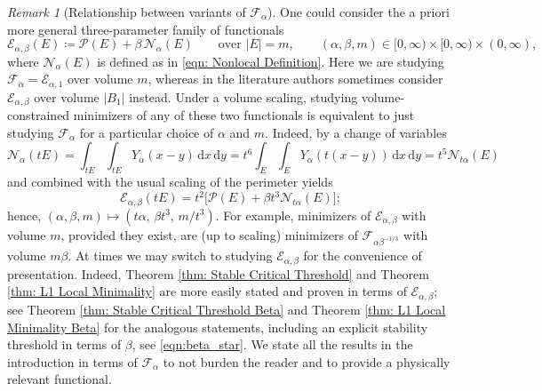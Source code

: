 \documentclass[a4paper,11pt,reqno]{amsart}
\numberwithin{equation}{section}
\theoremstyle{remark}
\newtheorem{remark}[theorem]{Remark}
\theoremstyle{definition}
\newcommand{\dd}{\,\mathrm{d}}
\newcommand{\defeq}{\coloneqq}
\newcommand{\ene}{\mathcal{E}_{\alpha,\beta}}
\newcommand{\enf}{\mathcal{F}_{\alpha}}
\newcommand{\nl}{\mathcal{N}_{\alpha}}
\newcommand{\calF}{\mathcal{F}}
\newcommand{\calN}{\mathcal{N}}
\newcommand{\calE}{\mathcal{E}}
\newcommand{\Pe}{\mathcal{P}}
\begin{document}
\begin{remark}[Relationship between variants of $\enf$]\label{rem:master}
One could consider the a priori more general three-parameter family of functionals
	\[
  		\ene(E)\defeq \Pe(E)+\beta\,\nl(E)\qquad\text{over }|E|=m, \qquad (\alpha,\beta,m)\in[0,\infty)\times[0,\infty)\times(0,\infty),
	\]
where $\nl(E)$ is defined as in \eqref{eqn: Nonlocal Definition}. Here we are studying $\enf=\calE_{\alpha,1}$ over volume $m$, whereas in the literature authors sometimes consider $\ene$ over volume $|B_1|$ instead. Under a volume scaling, studying volume-constrained minimizers of any of these two functionals is equivalent to just studying $\enf$ for a particular choice of $\alpha$ and $m$. Indeed, by a change of variables 
	\[
		\nl(tE) = \int_{tE}\int_{tE} Y_{\alpha}(x-y) \dd x \dd y = t^6 \int_E\int_E Y_{\alpha}(t(x-y)) \dd x\dd y = t^5\calN_{t\alpha}(E)
	\]
and combined with the usual scaling of the perimeter yields
	\begin{equation}\label{eqn:dilation}
  		\ene(tE)=t^2\bigl[\Pe(E)+\beta t^3\calN_{t\alpha}(E)\bigr];
	\end{equation}
hence, $(\alpha,\beta,m)\mapsto(t\alpha,\,\beta t^3,\,m/t^3)$. For example, minimizers of $\ene$ with volume $m$, provided they exist, are (up to scaling) minimizers of $\calF_{\alpha\beta^{-1/3}}$ with volume $m\beta$. At times we may switch to studying $\ene$ for the convenience of presentation. Indeed, Theorem \ref{thm: Stable Critical Threshold} and Theorem \ref{thm: L1 Local Minimality} are more easily stated and proven in terms of $\ene$; see Theorem \ref{thm: Stable Critical Threshold Beta} and Theorem \ref{thm: L1 Local Minimality Beta} for the analogous statements, including an explicit stability threshold in terms of $\beta$, see \eqref{eqn:beta_star}. We state all the results in the introduction in terms of $\enf$ to not burden the reader and to provide a physically relevant functional. 
\end{remark}	
\end{document}
